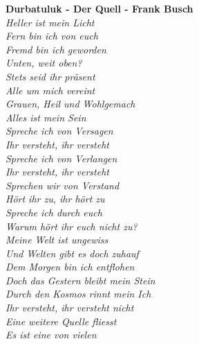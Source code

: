 \documentclass[twocolumn,10pt]{article}
\begin{document}
		\begin{center}
			\textbf{Durbatuluk - Der Quell - Frank Busch\cite{derQuellLyrics}}\\
			\textit{Heller ist mein Licht}\\
			\textit{Fern bin ich von euch}\\
			\textit{Fremd bin ich geworden}\\
			\textit{Unten, weit oben?}
\vspace{11pt}\\
			\textit{Stets seid ihr präsent}\\
			\textit{Alle um mich vereint}\\
			\textit{Grauen, Heil und Wohlgemach}\\
			\textit{Alles ist mein Sein}
\vspace{11pt}\\
			\textit{Spreche ich von Versagen}\\
			\textit{Ihr versteht, ihr versteht}\\
			\textit{Spreche ich von Verlangen}\\
			\textit{Ihr versteht, ihr versteht}
\vspace{11pt}\\			
			\textit{Sprechen wir von Verstand}\\
			\textit{Hört ihr zu, ihr hört zu}\\
			\textit{Spreche ich durch euch}\\
			\textit{Warum hört ihr euch nicht zu?}
\vspace{11pt}\\
			\textit{Meine Welt ist ungewiss}\\
			\textit{Und Welten gibt es doch zuhauf}\\
			\textit{Dem Morgen bin ich entflohen}\\
			\textit{Doch das Gestern bleibt mein Stein}
\vspace{11pt}\\
			\textit{Durch den Kosmos rinnt mein Ich}\\
			\textit{Ihr versteht, ihr versteht nicht}\\
			\textit{Eine weitere Quelle fliesst}\\
			\textit{Es ist eine von vielen}			
		\end{center}
			\clearpage
\end{document}
